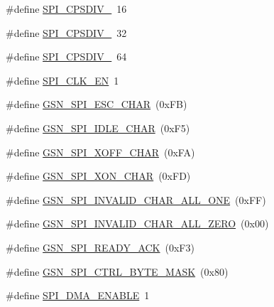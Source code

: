 \begin{DoxyCompactItemize}
\#define \hyperlink{a00587_a3874bbb3a35586cbda40389de9451dfe}{SPI\_\-CPSDIV\_}~16
\item 
\#define \hyperlink{a00587_a23ad18291368cbe0b4df864168f7a05c}{SPI\_\-CPSDIV\_}~32
\item 
\#define \hyperlink{a00587_ad50de377e5c2b1f24f383658becb263f}{SPI\_\-CPSDIV\_}~64
\item 
\#define \hyperlink{a00587_aeaf92c7c4fbd8a6ccda7d2100f26893f}{SPI\_\-CLK\_\-EN}~1
\item 
\#define \hyperlink{a00587_a79b2c337c31c23b301ac9382b3f42f80}{GSN\_\-SPI\_\-ESC\_\-CHAR}~(0xFB)
\item 
\#define \hyperlink{a00587_a51128f266b2ad7b1dcc922aad7bab865}{GSN\_\-SPI\_\-IDLE\_\-CHAR}~(0xF5)
\item 
\#define \hyperlink{a00587_ab11cbc78caad6500f4dafc6cce96b333}{GSN\_\-SPI\_\-XOFF\_\-CHAR}~(0xFA)
\item 
\#define \hyperlink{a00587_a528c822cb1ddcd15b249cb9e6aaa4816}{GSN\_\-SPI\_\-XON\_\-CHAR}~(0xFD)
\item 
\#define \hyperlink{a00587_a5da46db11267d953ab7f05b41c7531b7}{GSN\_\-SPI\_\-INVALID\_\-CHAR\_\-ALL\_\-ONE}~(0xFF)
\item 
\#define \hyperlink{a00587_aa59091c91594ff6b82a646aa28581b4f}{GSN\_\-SPI\_\-INVALID\_\-CHAR\_\-ALL\_\-ZERO}~(0x00)
\item 
\#define \hyperlink{a00587_a7e9dabab86b384dbf1dcfe1d8a757b47}{GSN\_\-SPI\_\-READY\_\-ACK}~(0xF3)
\item 
\#define \hyperlink{a00587_a361e1e9747279106b4a35abc82b77de3}{GSN\_\-SPI\_\-CTRL\_\-BYTE\_\-MASK}~(0x80)
\item 
\#define \hyperlink{a00587_a82dc6617ad4a3ec4336c9739f8657e1c}{SPI\_\-DMA\_\-ENABLE}~1
\end{DoxyCompactItemize}
